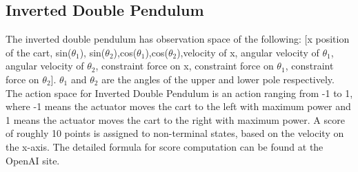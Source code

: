\subsection{Inverted Double Pendulum}
The inverted double pendulum has observation space of the following: [x position of the cart, sin($\theta_1$), sin($\theta_2$),cos($\theta_1$),cos($\theta_2$),velocity of x, angular velocity of $\theta_1$, angular velocity of $\theta_2$, constraint force on x, constraint force on $\theta_1$, constraint force on $\theta_2$]. $\theta_1$ and $\theta_2$ are the angles of the upper and lower pole respectively. The action space for Inverted Double Pendulum is an action ranging from -1 to 1, where -1 means the actuator moves the cart to the left with maximum power and 1 means the actuator moves the cart to the right with maximum power. A score of roughly 10 points is assigned to non-terminal states, based on the velocity on the x-axis. The detailed formula for score computation can be found at the OpenAI site.

